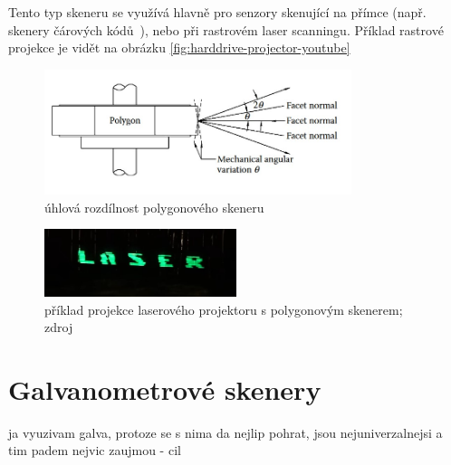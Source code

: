 Tento typ skeneru se využívá hlavně pro senzory skenující na přímce (např. skenery čárových kódů~\cite{history-of-barcode-scanning}), nebo při rastrovém laser scanningu. Příklad rastrové projekce je vidět na obrázku \ref{fig:harddrive-projector-youtube}

\begin{figure}[!htb]
  \centering
  \includegraphics[width=0.8\textwidth]{img/polygon-angular-variation.jpg}
  \caption{\label{fig:polygon-angular-variation} úhlová rozdílnost polygonového skeneru}
\end{figure}


\begin{figure}[!htb]
  \centering
  \includegraphics[width=0.5\textwidth]{img/harddrive-projection.jpg}
  \caption{\label{fig:harddrive-projection} příklad projekce laserového projektoru s polygonovým skenerem; zdroj \cite{harddrive-projector-youtube}}
\end{figure}

\section{Galvanometrové skenery}



ja vyuzivam galva, protoze se s nima da nejlip pohrat, jsou nejuniverzalnejsi a tim padem nejvic zaujmou - cil